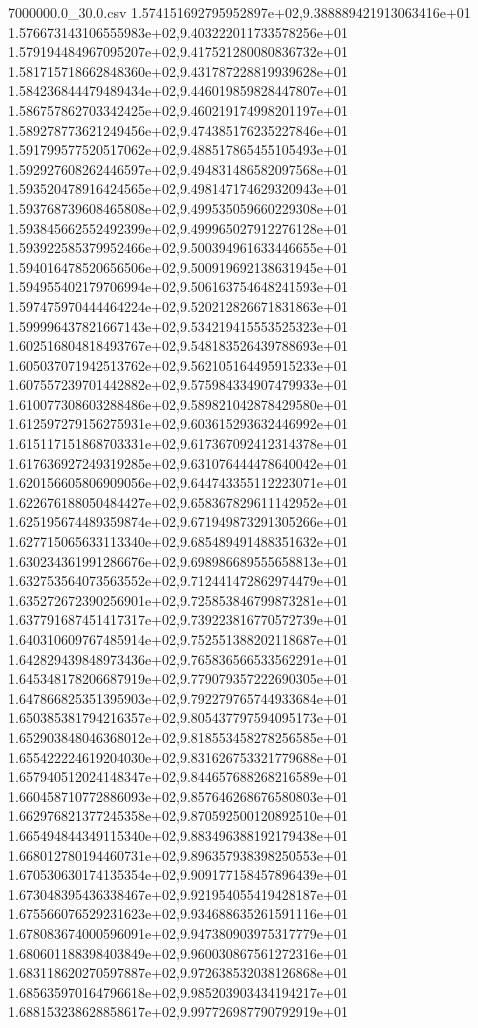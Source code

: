 \begin{filecontents*}{7000000.0_30.0.csv}
1.574151692795952897e+02,9.388889421913063416e+01
1.576673143106555983e+02,9.403222011733578256e+01
1.579194484967095207e+02,9.417521280080836732e+01
1.581715718662848360e+02,9.431787228819939628e+01
1.584236844479489434e+02,9.446019859828447807e+01
1.586757862703342425e+02,9.460219174998201197e+01
1.589278773621249456e+02,9.474385176235227846e+01
1.591799577520517062e+02,9.488517865455105493e+01
1.592927608262446597e+02,9.494831486582097568e+01
1.593520478916424565e+02,9.498147174629320943e+01
1.593768739608465808e+02,9.499535059660229308e+01
1.593845662552492399e+02,9.499965027912276128e+01
1.593922585379952466e+02,9.500394961633446655e+01
1.594016478520656506e+02,9.500919692138631945e+01
1.594955402179706994e+02,9.506163754648241593e+01
1.597475970444464224e+02,9.520212826671831863e+01
1.599996437821667143e+02,9.534219415553525323e+01
1.602516804818493767e+02,9.548183526439788693e+01
1.605037071942513762e+02,9.562105164495915233e+01
1.607557239701442882e+02,9.575984334907479933e+01
1.610077308603288486e+02,9.589821042878429580e+01
1.612597279156275931e+02,9.603615293632446992e+01
1.615117151868703331e+02,9.617367092412314378e+01
1.617636927249319285e+02,9.631076444478640042e+01
1.620156605806909056e+02,9.644743355112223071e+01
1.622676188050484427e+02,9.658367829611142952e+01
1.625195674489359874e+02,9.671949873291305266e+01
1.627715065633113340e+02,9.685489491488351632e+01
1.630234361991286676e+02,9.698986689555658813e+01
1.632753564073563552e+02,9.712441472862974479e+01
1.635272672390256901e+02,9.725853846799873281e+01
1.637791687451417317e+02,9.739223816770572739e+01
1.640310609767485914e+02,9.752551388202118687e+01
1.642829439848973436e+02,9.765836566533562291e+01
1.645348178206687919e+02,9.779079357222690305e+01
1.647866825351395903e+02,9.792279765744933684e+01
1.650385381794216357e+02,9.805437797594095173e+01
1.652903848046368012e+02,9.818553458278256585e+01
1.655422224619204030e+02,9.831626753321779688e+01
1.657940512024148347e+02,9.844657688268216589e+01
1.660458710772886093e+02,9.857646268676580803e+01
1.662976821377245358e+02,9.870592500120892510e+01
1.665494844349115340e+02,9.883496388192179438e+01
1.668012780194460731e+02,9.896357938398250553e+01
1.670530630174135354e+02,9.909177158457896439e+01
1.673048395436338467e+02,9.921954055419428187e+01
1.675566076529231623e+02,9.934688635261591116e+01
1.678083674000596091e+02,9.947380903975317779e+01
1.680601188398403849e+02,9.960030867561272316e+01
1.683118620270597887e+02,9.972638532038126868e+01
1.685635970164796618e+02,9.985203903434194217e+01
1.688153238628858617e+02,9.997726987790792919e+01

\end{filecontents*}
